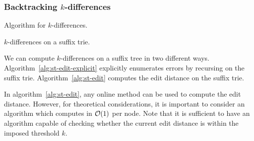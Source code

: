 \subsubsection{Backtracking $k$-differences}

Algorithm for $k$-differences.

\begin{algorithm}[h]
\caption{$k$-differences on a suffix trie.}
\label{alg:st-edit}
\begin{algorithmic}[1]
		\State \Report {}
			\Repeat
				\State {}
		\EndIf
	\EndIf
\EndProcedure
\end{algorithmic}
\end{algorithm}

We can compute $k$-differences on a suffix tree in two different ways. Algorithm~\ref{alg:st-edit-explicit} explicitly enumerates errors by recursing on the suffix trie. Algorithm~\ref{alg:st-edit} computes the edit distance on the suffix trie.

%

In algorithm~\ref{alg:st-edit}, any online method can be used to compute the edit distance.
However, for theoretical considerations, it is important to consider an algorithm which computes in $\mathcal{O}(1)$ per node.
Note that it is sufficient to have an algorithm capable of checking whether the current edit distance is within the imposed threshold $k$.

